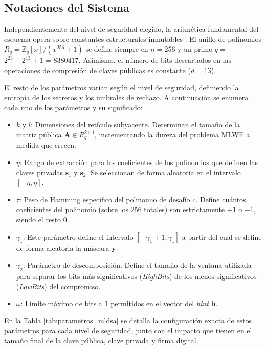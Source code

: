 \documentclass[11pt, a4paper]{report}
\theoremstyle{definition}
\begin{document}
\subsection{Notaciones del Sistema}

Independientemente del nivel de seguridad elegido, la aritmética fundamental del esquema opera sobre constantes estructurales inmutables \cite{nist_fips204}. El anillo de polinomios $R_q = \mathbb{Z}_q[x]/(x^{256} + 1)$ se define siempre en $n = 256$ y un primo $q =$ $2^{23} - 2^{13} + 1$ = 8380417. Asimismo, el número de bits descartados en las operaciones de compresión de claves públicas es constante ($d = 13$).

El resto de los parámetros varían según el nivel de seguridad, definiendo la entropía de los secretos y los umbrales de rechazo. A continuación se enumera cada uno de los parámetros y su significado:

\begin{itemize}
    \item $k$ y $l$: Dimensiones del retículo subyacente. Determinan el tamaño de la matriz pública $\mathbf{A} \in R_q^{k \times l}$, incrementando la dureza del problema MLWE a medida que crecen.
    \item $\eta$: Rango de extracción para los coeficientes de los polinomios que definen las claves privadas $\mathbf{s}_1$ y $\mathbf{s}_2$. Se seleccionan de forma aleatoria en el intervalo $[-\eta, \eta]$.
    \item $\tau$: Peso de Hamming específico del polinomio de desafío $c$. Define cuántos coeficientes del polinomio (sobre los 256 totales) son estrictamente $+1$ o $-1$, siendo el resto $0$.
    \item $\gamma_1$: Este parámetro define el intervalo $[-\gamma_1 + 1, \gamma_1]$ a partir del cual se define de forma aleatoria la máscara $\mathbf{y}$.
    \item $\gamma_2$: Parámetro de descomposición. Define el tamaño de la ventana utilizada para separar los bits más significativos (\textit{HighBits}) de los menos significativos (\textit{LowBits}) del compromiso.
    \item $\omega$: Límite máximo de bits a 1 permitidos en el vector del \textit{hint} $\mathbf{h}$.
\end{itemize}

En la Tabla \ref{tab:parametros_mldsa} se detalla la configuración exacta de estos parámetros para cada nivel de seguridad, junto con el impacto que tienen en el tamaño final de la clave pública, clave privada y firma digital.
\end{document}
